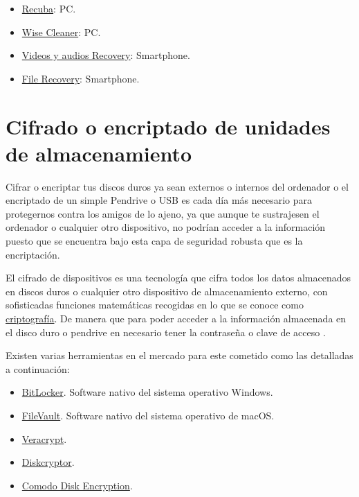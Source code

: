 \documentclass[
  a4paper,
  openany]{book}
\begin{document}
\begin{itemize}
\item
  \href{https://www.ccleaner.com/recuva}{Recuba}: PC.
\item
  \href{https://www.wisecleaner.com/wise-data-recovery.html}{Wise Cleaner}: PC.
\item
  \href{https://play.google.com/store/apps/details?id=com.mediarecovery.deletedvideorecovery.deletedaudiorecovery\&hl=es}{Videos y audios Recovery}: Smartphone.
\item
  \href{https://play.google.com/store/apps/details?id=com.file.recovery.data.recovery.deletedfilerecovery}{File Recovery}: Smartphone.
\end{itemize}

\hypertarget{cifrado-o-encriptado-de-unidades-de-almacenamiento}{%
\section{Cifrado o encriptado de unidades de almacenamiento}\label{cifrado-o-encriptado-de-unidades-de-almacenamiento}}

Cifrar o encriptar tus discos duros ya sean externos o internos del ordenador o el encriptado de un simple Pendrive o USB es cada día más necesario para protegernos contra los amigos de lo ajeno, ya que aunque te sustrajesen el ordenador o cualquier otro dispositivo, no podrían acceder a la información puesto que se encuentra bajo esta capa de seguridad robusta que es la encriptación.

El cifrado de dispositivos es una tecnología que cifra todos los datos almacenados en discos duros o cualquier otro dispositivo de almacenamiento externo, con sofisticadas funciones matemáticas recogidas en lo que se conoce como \href{https://es.wikipedia.org/wiki/Criptografía}{criptografía}. De manera que para poder acceder a la información almacenada en el disco duro o pendrive en necesario tener la contraseña o clave de acceso \citep{cifrado}.

Existen varias herramientas en el mercado para este cometido como las detalladas a continuación:

\begin{itemize}
\item
  \href{https://docs.microsoft.com/es-es/windows/security/information-protection/bitlocker/bitlocker-overview}{BitLocker}. Software nativo del sistema operativo Windows.
\item
  \href{https://support.apple.com/es-es/HT204837}{FileVault}. Software nativo del sistema operativo de macOS.
\item
  \href{https://www.veracrypt.fr}{Veracrypt}.
\item
  \href{https://diskcryptor.org/}{Diskcryptor}.
\item
  \href{https://www.comodo.com/home/internet-security/disk-encryption.php}{Comodo Disk Encryption}.
\end{itemize}
\end{document}
